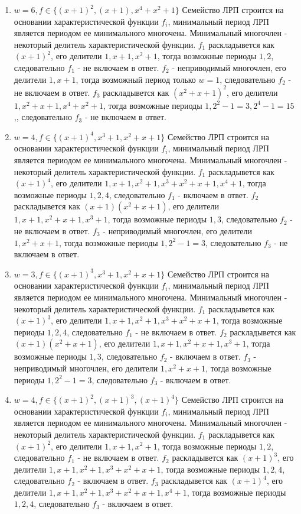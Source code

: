 \documentclass[utf8x, 14pt]{G7-32} %
\begin{document}
\begin{enumerate}
    \item $w=6, f\in \{(x+1)^2, (x+1), x^4+x^2+1\}$
    Семейство ЛРП строится на основании характеристической функции $f_i$, минимальный период ЛРП является периодом ее минимального многочена. Минимальный многочлен - некоторый делитель характеристической функции. $f_1$ раскладывется как $(x+1)^2$, его делители $1, x+1, x^2+1$, тогда возможные периоды $1, 2$, следовательно $f_1$ - не включаем в ответ. $f_2$ - неприводимый многочлен, его делители $1, x+1$, тогда возможный период только $w=1$, следовательно $f_2$ - не включаем в ответ. $f_3$ раскладывется как $(x^2+x+1)^2$, его делители $1, x^2+x+1, x^4+x^2+1$, тогда возможные периоды $1, 2^2-1=3, 2^4-1=15$,, следовательно $f_3$ - не включаем в ответ. 
    
    \item $w=4, f\in \{(x+1)^4, x^3+1, x^2+x+1\}$
    Семейство ЛРП строится на основании характеристической функции $f_i$, минимальный период ЛРП является периодом ее минимального многочена. Минимальный многочлен - некоторый делитель характеристической функции. $f_1$ раскладывется как $(x+1)^4$, его делители $1, x+1, x^2+1, x^3 +x^2+x + 1, x^4 +1$, тогда возможные периоды $1, 2, 4$, следовательно $f_1$ - включаем в ответ. $f_2$ раскладывется как $(x+1)(x^2+x+1)$, его делители $1, x+1, x^2+x+1, x^3+1$, тогда возможные периоды $1, 3$, следовательно $f_2$ - не включаем в ответ. $f_3$ - неприводимый многочлен, его делители $1, x^2+x+1$, тогда возможные периоды $1, 2^2-1=3$, следовательно $f_3$ - не включаем в ответ.
    
    \item $w=3, f\in \{(x+1)^3, x^3+1, x^2+x+1\}$
    Семейство ЛРП строится на основании характеристической функции $f_i$, минимальный период ЛРП является периодом ее минимального многочена. Минимальный многочлен - некоторый делитель характеристической функции. $f_1$ раскладывется как $(x+1)^3$, его делители $1, x+1, x^2+1, x^3 +x^2+x+ 1$, тогда возможные периоды $1, 2, 4$, следовательно $f_1$ - не включаем в ответ. $f_2$ раскладывется как $(x+1)(x^2+x+1)$, его делители $1, x+1, x^2+x+1, x^3+1$, тогда возможные периоды $1, 3$, следовательно $f_2$ - включаем в ответ. $f_3$ - неприводимый многочлен, его делители $1, x^2+x+1$, тогда возможные периоды $1, 2^2-1=3$, следовательно $f_3$ - включаем в ответ.
    
    \item $w=4, f\in \{(x+1)^2, (x+1)^3, (x+1)^4\}$
    Семейство ЛРП строится на основании характеристической функции $f_i$, минимальный период ЛРП является периодом ее минимального многочена. Минимальный многочлен - некоторый делитель характеристической функции. $f_1$ раскладывется как $(x+1)^2$, его делители $1, x+1, x^2+1$, тогда возможные периоды $1, 2$, следовательно $f_1$ - не включаем в ответ. $f_2$ раскладывется как $(x+1)^3$, его делители $1, x+1, x^2+1, x^3+x^2+x+1$, тогда возможные периоды $1, 2, 4$, следовательно $f_2$ - включаем в ответ. $f_3$ раскладывется как $(x+1)^4$, его делители $1, x+1, x^2+1, x^3 +x^2+x+ 1, x^4 +1$, тогда возможные периоды $1, 2, 4$, следовательно $f_3$ - включаем в ответ.
    

\end{enumerate}
\end{document}
